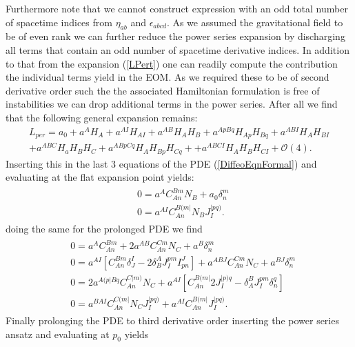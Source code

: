 \documentclass[a4paper,12pt, DIV=14, BCOR=5mm, twoside, headsepline]{scrbook}
\begin{document}
Furthermore note that we cannot construct expression with an odd total number of spacetime indices from $\eta_{ab}$ and $\epsilon_{abcd}$. As we assumed the gravitational field to be of even rank we can further reduce the power series expansion by discharging all terms that contain an odd number of spacetime derivative indices. In addition to that from the expansion (\ref{LPert}) one can readily compute the contribution the individual terms yield in the EOM.  As we required these to be of second derivative order such the the associated Hamiltonian formulation is free of instabilities we can drop additional terms in the power series. After all we find that the following general expansion remains: 
\begin{multline}\label{LperRed}
     L_{per} = a_0 + a^A H_A + a^{AI}H_{AI} + a^{AB} H_{A}H_{B} + a^{ApBq} H_{Ap}H_{Bq} + a^{ABI} H_{A} H_{BI} \\
    + a^{ABC} H_a H_B H_C + a^{ABpCq} H_{A}H_{Bp}H_{Cq} +
    + a^{ABCI} H_A H_B H_{CI} 
    + \mathcal{O}(4).
\end{multline}
Inserting this in the last 3 equations of the PDE (\ref{DiffeoEqnFormal}) and evaluating at the flat expansion point yields:
\begin{align}\label{order1}
    \begin{aligned}
    &0 = a^A C_{An}^{Bm}N_B + a_0 \delta^m_n\\
    &0 = a^{AI}C_{An}^{B(m\vert }N_B J^{\vert pq)}_I.
    \end{aligned}
\end{align}
doing the same for the prolonged PDE we find 
\begin{align}\label{order2}
    \begin{aligned}
    &0 = a^A C_{An}^{Bm} + 2 a^{AB}C_{An}^{Cm}N_C + a^B\delta^m_n\\
    &0 = a^{AI}\left [C_{An}^{Bm}\delta^I _J- 2 \delta^A_B J_I^{pm}I^J_{pn} \right ] + a^{ABJ}C_{An}^{Cm}N_C + a^{BJ} \delta^m_n \\
    &0 = 2a^{A(p\vert Bq}C_{An}^{C\vert m)}N_C + a^{AI} \left [C_{An}^{B(m\vert} 2 J_{I}^{\vert p)q} - \delta_A^BJ_I^{pm}\delta^q_n \right ]\\
    &0 = a^{BAI}C_{An}^{C(m\vert}N_CJ_I^{\vert pq)} + a^{AI}C_{An}^{B(m \vert} J_I^{\vert pq)}.
    \end{aligned}
\end{align}
Finally prolonging the PDE to third derivative order inserting the power series ansatz and evaluating at $p_0$ yields
\end{document}
